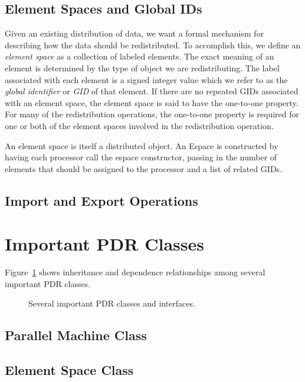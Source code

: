 \documentclass[12pt,relax]{PetraObjectModel}
\begin{document}
\subsection{Element Spaces and Global IDs}

Given an existing distribution of data, we want a formal mechanism for describing
how the data should be redistributed.  To accomplish this, we define an 
{\it element space} as a collection of labeled elements.  The exact meaning of
an element is determined by the type of object we are redistributing.
The label associated with each element is a signed integer value which we refer to as
the {\it global identifier} or {\it GID} of that element.  If there are no 
repeated GIDs associated with an element space, the element space is said to 
have the one-to-one property.  For many of the redistribution operations, the
one-to-one property is required for one or both of the element spaces involved
in the redistribution operation.

An element space is itself a distributed object.  An Espace is constructed by 
having each processor call the espace constructor, passing in the number of
elements that should be assigned to the processor and a list of related GIDs.

\subsection{Import and Export Operations}

\section{Important PDR Classes}

Figure~\ref{importfigure} shows inheritance and dependence relationships among
several important PDR classes.
\begin{figure}[ht]
\begin{center}
\caption{Several important PDR classes and interfaces.}
\label{importfigure}
\end{center}
\end{figure}

\subsection{Parallel Machine Class}

\subsection{Element Space Class}
\end{document}
